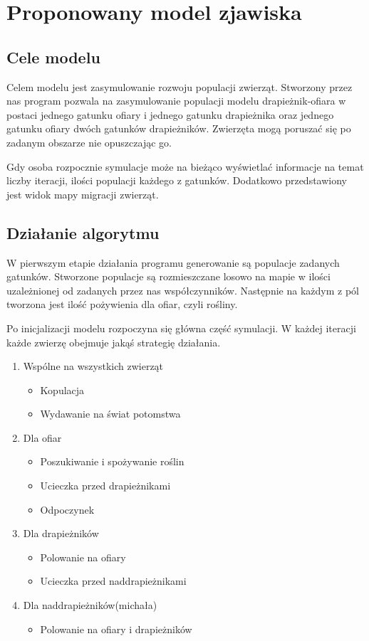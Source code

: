 \chapter{Proponowany model zjawiska}

\section{Cele modelu}
Celem modelu jest zasymulowanie rozwoju populacji zwierząt. Stworzony przez nas program pozwala na zasymulowanie populacji modelu drapieżnik-ofiara w postaci jednego gatunku ofiary i  jednego gatunku drapieżnika oraz jednego gatunku ofiary dwóch gatunków drapieżników. Zwierzęta mogą poruszać się po zadanym obszarze nie opuszczając go. 

Gdy osoba rozpocznie symulacje może na bieżąco wyświetlać informacje na temat liczby iteracji, ilości populacji każdego z gatunków. Dodatkowo przedstawiony jest widok mapy migracji zwierząt.

\section{Działanie algorytmu} 
W pierwszym etapie działania programu generowanie są populacje zadanych gatunków. Stworzone populacje są rozmieszczane losowo na mapie w ilości uzależnionej od zadanych przez nas współczynników. Następnie na każdym z pól tworzona jest ilość pożywienia dla ofiar, czyli rośliny. 

Po inicjalizacji modelu rozpoczyna się główna część symulacji. W każdej iteracji każde zwierzę obejmuje jakąś strategię działania.
\begin{enumerate}
\item Wspólne na wszystkich zwierząt
	\begin{itemize}
		\item Kopulacja
		\item Wydawanie na świat potomstwa
	\end{itemize}
\item Dla ofiar
	\begin{itemize}
		\item Poszukiwanie i spożywanie roślin
		\item Ucieczka przed drapieżnikami
		\item Odpoczynek
	\end{itemize}
\item Dla drapieżników
	\begin{itemize}
		\item Polowanie na ofiary
		\item Ucieczka przed naddrapieżnikami
	\end{itemize}
\item Dla naddrapieżników(michała)
	\begin{itemize}
		\item Polowanie na ofiary i drapieżników
	\end{itemize}
\end{enumerate}


